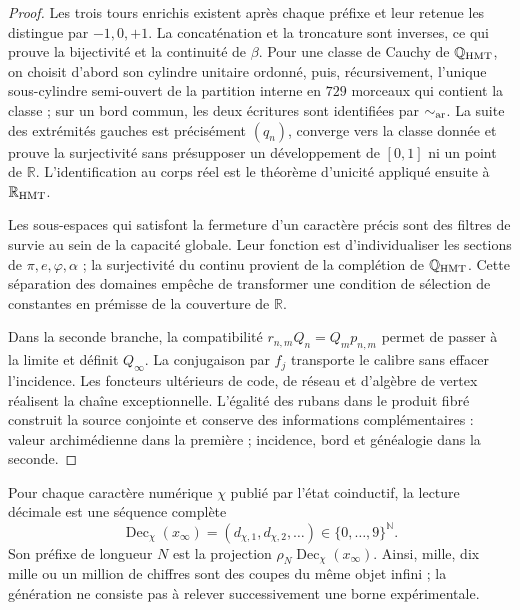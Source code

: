 \begin{proof}
Les trois tours enrichis existent après chaque préfixe et leur retenue
les distingue par \(-1,0,+1\). La concaténation et la troncature sont
inverses, ce qui prouve la bijectivité et la continuité de \(\beta\). Pour une
classe de Cauchy de \(\mathbb Q_{\rm HMT}\), on choisit d'abord son cylindre
unitaire ordonné, puis, récursivement, l'unique sous-cylindre semi-ouvert
de la partition interne en \(729\) morceaux qui contient la classe ; sur un
bord commun, les deux écritures sont identifiées par \(\sim_{\rm ar}\).
La suite des extrémités gauches est précisément \((q_n)\), converge vers la
classe donnée et prouve la surjectivité sans présupposer un développement de
\([0,1]\) ni un point de \(\mathbb R\). L'identification au corps réel
est le théorème d'unicité appliqué ensuite à \(\mathbb R_{\rm HMT}\).

Les sous-espaces qui satisfont la fermeture d'un caractère précis sont des filtres
de survie au sein de la capacité globale. Leur fonction est d'individualiser
les sections de \(\pi,e,\varphi,\alpha\) ; la surjectivité du continu
provient de la complétion de \(\mathbb Q_{\rm HMT}\). Cette séparation des
domaines empêche
de transformer une condition de sélection de constantes en prémisse de la
couverture de \(\mathbb R\).

Dans la seconde branche, la compatibilité
\(r_{n,m}Q_n=Q_m p_{n,m}\) permet de passer à la limite et définit \(Q_\infty\).
La conjugaison par \(f_j\) transporte le calibre sans effacer l'incidence.
Les foncteurs ultérieurs de code, de réseau et d'algèbre de vertex réalisent
la chaîne exceptionnelle. L'égalité des rubans dans le produit fibré
construit la source conjointe et conserve des informations complémentaires : valeur
archimédienne dans la première ; incidence, bord et généalogie dans la seconde.
\end{proof}

\begin{corollary}
\label{cor:c27-expansion-infinita-objeto}
Pour chaque caractère numérique \(\chi\) publié par l'état coinductif, la
lecture décimale est une séquence complète
\[
 \operatorname{Dec}_\chi(x_\infty)
 =(d_{\chi,1},d_{\chi,2},\ldots)
 \in\{0,\ldots,9\}^{\mathbb N}.
\]
Son préfixe de longueur \(N\) est la projection
\(\rho_N\operatorname{Dec}_\chi(x_\infty)\). Ainsi, mille, dix mille ou un
million de chiffres sont des coupes du même objet infini ; la génération ne
consiste pas à relever successivement une borne expérimentale.
\end{corollary}

